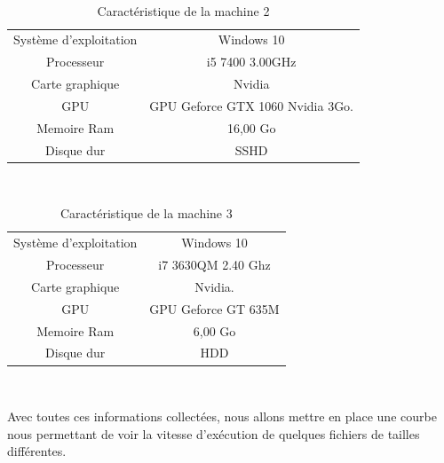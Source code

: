 \documentclass[a4paper, 12pt]{book}
\begin{document}


\paragraph{}
\begin{table}[h]
  \centering
\begin{tabular}{|c|c|}
    \hline
    \rowcolor{gray}
   \multicolumn{2}{|c|}{Machine 2}\\
    \hline 
       Système d'exploitation &Windows 10\\
    \hline 
       Processeur&i5 7400 3.00GHz\\
       
       \hline 
       Carte graphique&Nvidia\\
       
    \hline
       GPU&GPU Geforce GTX 1060 Nvidia 3Go.\\
    
    \hline 
       Memoire Ram&16,00 Go\\
    \hline
      Disque dur&SSHD\\
    \hline
\end{tabular}\\
\caption{Caractéristique de la machine 2}
\label{machine2}
\end{table}


\begin{table}[h]
  \centering
\begin{tabular}{|c|c|}
    \hline
    \rowcolor{gray}
   \multicolumn{2}{|c|}{Machine 1}\\
    \hline 
       Système d'exploitation &Windows 10\\
    \hline 
       Processeur&i7 3630QM  2.40 Ghz\\
       \hline 
       Carte graphique&Nvidia.\\
       
    \hline
       GPU&GPU Geforce GT 635M\\
    
    \hline 
       Memoire Ram&6,00 Go\\
    \hline
      Disque dur&HDD\\
    \hline
\end{tabular}\\
\caption{Caractéristique de la machine 3}
\label{machine3}
\end{table}
Avec toutes ces informations collectées, nous allons mettre en place une courbe nous permettant de voir la vitesse d’exécution de quelques fichiers de tailles différentes.
\end{document}
